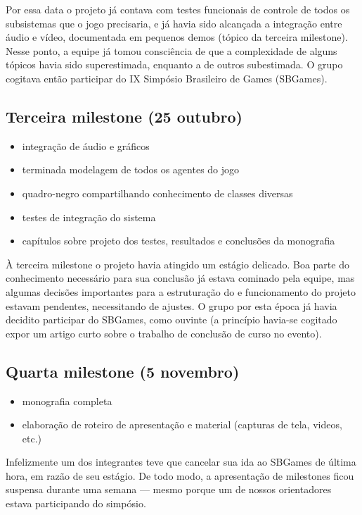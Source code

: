 Por essa data o projeto já contava com testes funcionais de controle de todos os subsistemas que o jogo precisaria, e já havia sido alcançada a integração entre áudio e vídeo, documentada em pequenos demos (tópico da terceira milestone). Nesse ponto, a equipe já tomou consciência de que a complexidade de alguns tópicos havia sido superestimada, enquanto a de outros subestimada. O grupo cogitava então participar do IX Simpósio Brasileiro de Games (SBGames).

\subsection{Terceira milestone (25 outubro)}
\begin{itemize}
\item integração de áudio e gráficos
\item terminada modelagem de todos os agentes do jogo
\item quadro-negro compartilhando conhecimento de classes diversas
\item testes de integração do sistema
\item capítulos sobre projeto dos testes, resultados e conclusões da monografia
\end{itemize}

À terceira milestone o projeto havia atingido um estágio delicado. Boa parte do conhecimento necessário para sua conclusão já estava cominado pela equipe, mas algumas decisões importantes para a estruturação do e funcionamento do projeto estavam pendentes, necessitando de ajustes. O grupo por esta época já havia decidito participar do SBGames, como ouvinte (a princípio havia-se cogitado expor um artigo curto sobre o trabalho de conclusão de curso no evento).   

\subsection{Quarta milestone (5 novembro)}
\begin{itemize}
\item monografia completa
\item elaboração de roteiro de apresentação e material (capturas de tela, videos, etc.)
\end{itemize}

Infelizmente um dos integrantes teve que cancelar sua ida ao SBGames de última hora, em razão de seu estágio. De todo modo, a apresentação de milestones ficou suspensa durante uma semana --- mesmo porque um de nossos orientadores estava participando do simpósio.

